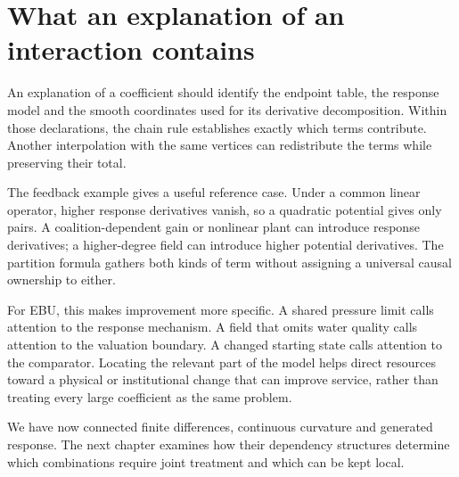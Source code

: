 \section{What an explanation of an interaction contains}
An explanation of a coefficient should identify the endpoint table, the response model and the smooth coordinates used for its derivative decomposition. Within those declarations, the chain rule establishes exactly which terms contribute. Another interpolation with the same vertices can redistribute the terms while preserving their total.

The feedback example gives a useful reference case. Under a common linear operator, higher response derivatives vanish, so a quadratic potential gives only pairs. A coalition-dependent gain or nonlinear plant can introduce response derivatives; a higher-degree field can introduce higher potential derivatives. The partition formula gathers both kinds of term without assigning a universal causal ownership to either.

For EBU, this makes improvement more specific. A shared pressure limit calls attention to the response mechanism. A field that omits water quality calls attention to the valuation boundary. A changed starting state calls attention to the comparator. Locating the relevant part of the model helps direct resources toward a physical or institutional change that can improve service, rather than treating every large coefficient as the same problem.

We have now connected finite differences, continuous curvature and generated response. The next chapter examines how their dependency structures determine which combinations require joint treatment and which can be kept local.
